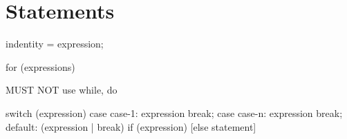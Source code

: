 \chapter{Statements}
indentity = expression;

for (expressions) {
}

MUST NOT use while, do

switch (expression) {
    case case-1:
        expression
        break;
    case case-n:
        expression
        break;
    default:
        (expression | break)
}
if (expression) {
} [else statement]
